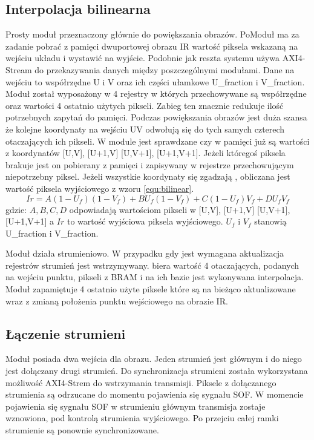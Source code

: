\subsection{Interpolacja bilinearna}
Prosty moduł przeznaczony głównie do powiększania obrazów. PoModuł ma za zadanie pobrać z pamięci dwuportowej obrazu IR wartość piksela wskazaną na wejściu układu i wystawić na wyjście. Podobnie jak reszta systemu używa AXI4-Stream do przekazywania danych między poszczególnymi modułami. Dane na wejściu to współrzędne U i V oraz ich części ułamkowe U\_fraction i V\_fraction. Moduł został wyposażony w 4 rejestry w których przechowywane są współrzędne oraz wartości 4 ostatnio użytych pikseli. Zabieg ten znacznie redukuje ilość potrzebnych zapytań do pamięci. Podczas powiększania obrazów jest duża szansa że kolejne koordynaty na wejściu UV odwołują się do tych samych czterech otaczających ich pikseli. W module jest sprawdzane czy w pamięci już są wartości z koordynatów [U,V], [U+1,V] [U,V+1], [U+1,V+1]. Jeżeli któregoś piksela brakuje jest on pobierany z pamięci i zapisywany w rejestrze przechowującym niepotrzebny piksel. Jeżeli wszystkie koordynaty się zgadzają , obliczana jest wartość piksela wyjściowego z wzoru \ref{equ:bilinear}.  
\begin{equation}\label{equ:bilinear}
Ir = A(1-U_f)(1-V_f)+BU_f(1-V_f)+C(1-U_f)V_f+ D U_fV_f
\end{equation}
\noindent gdzie: $ A, B, C ,D $ odpowiadają wartościom pikseli w [U,V], [U+1,V] [U,V+1], [U+1,V+1] a $ Ir $ to wartość wyjściowa piksela wyjściowego. $U_f$ i $V_f$ stanowią U\_fraction i V\_fraction.

Moduł działa strumieniowo. W przypadku gdy jest wymagana aktualizacja rejestrów strumień jest wstrzymywany.
biera wartość 4 otaczających, podanych na wejściu punktu, pikseli z BRAM i na ich bazie jest wykonywana interpolacja. Moduł zapamiętuje 4 ostatnio użyte piksele które są na bieżąco aktualizowane wraz z zmianą położenia punktu wejściowego na obrazie IR.
\subsection{Łączenie strumieni}
Moduł posiada dwa wejścia dla obrazu. Jeden strumień jest głównym i do niego jest dołączany drugi strumień. Do synchronizacja strumieni została wykorzystana możliwość AXI4-Strem do wstrzymania transmisji. Piksele z dołączanego strumienia są odrzucane do momentu pojawienia się sygnału SOF. W momencie pojawienia się sygnału SOF w strumieniu głównym transmisja zostaje wznowiona, pod kontrolą strumienia wyjściowego. Po przejciu całej ramki strumienie są ponownie synchronizowane.  
